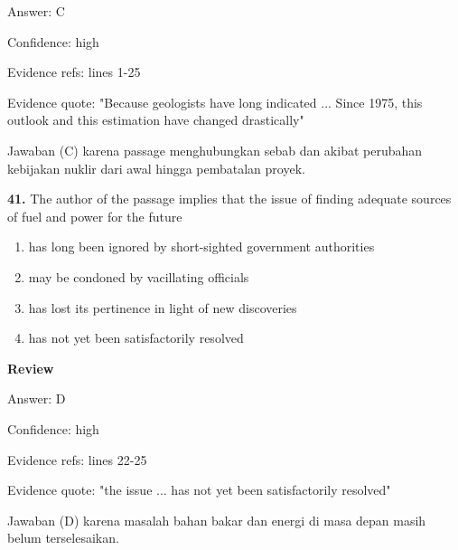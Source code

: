 \documentclass[12pt]{article}
\begin{document}
Answer: C\par
Confidence: high\par
Evidence refs: lines 1-25\par
Evidence quote: "Because geologists have long indicated ... Since 1975, this outlook and this estimation have changed drastically"\par
Jawaban (C) karena passage menghubungkan sebab dan akibat perubahan kebijakan nuklir dari awal hingga pembatalan proyek.\par
\endgroup
\par
\vspace{0.25\baselineskip}
\noindent\textbf{41.} The author of the passage implies that the issue of finding adequate sources of fuel and power for the future
\begin{enumerate}[label=(\Alph*),leftmargin=*,itemsep=0.2em]
\item has long been ignored by short-sighted government authorities
\item may be condoned by vacillating officials
\item has lost its pertinence in light of new discoveries
\item has not yet been satisfactorily resolved
\end{enumerate}
\par
\begingroup
\setlength{\parskip}{0pt}
\setlength{\parindent}{0pt}
\textbf{Review}\par
Answer: D\par
Confidence: high\par
Evidence refs: lines 22-25\par
Evidence quote: "the issue ... has not yet been satisfactorily resolved"\par
Jawaban (D) karena masalah bahan bakar dan energi di masa depan masih belum terselesaikan.\par
\endgroup
\par
\vspace{0.25\baselineskip}
\end{document}
